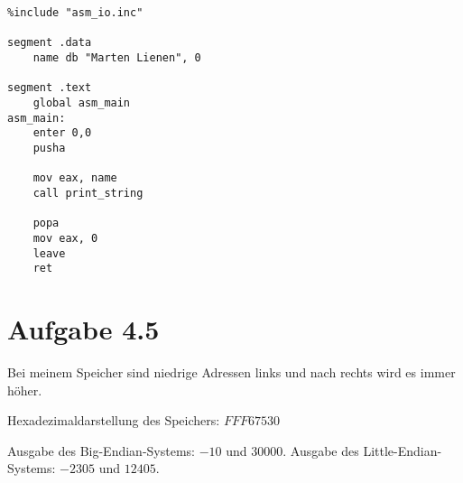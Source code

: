\documentclass[10pt,a4paper]{article}
\begin{document}
\begin{lstlisting}
%include "asm_io.inc"

segment .data
	name db "Marten Lienen", 0

segment .text
	global asm_main
asm_main:
	enter 0,0
	pusha

	mov eax, name
	call print_string

	popa
	mov eax, 0
	leave
	ret

\end{lstlisting}

\section*{Aufgabe 4.5}

Bei meinem Speicher sind niedrige Adressen links und nach rechts wird es immer höher.

Hexadezimaldarstellung des Speichers: $FFF67530$

Ausgabe des Big-Endian-Systems: $-10$ und $30000$.
Ausgabe des Little-Endian-Systems: $-2305$ und $12405$.
\end{document}

